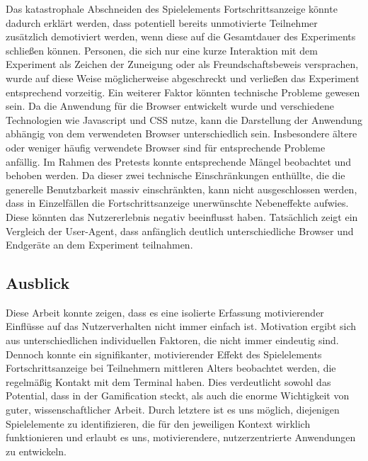 Das katastrophale Abschneiden des Spielelements Fortschrittsanzeige könnte dadurch erklärt werden, dass potentiell bereits unmotivierte Teilnehmer zusätzlich demotiviert werden, wenn diese auf die Gesamtdauer des Experiments schließen können. Personen, die sich nur eine kurze Interaktion mit dem Experiment als Zeichen der Zuneigung oder als Freundschaftsbeweis versprachen, wurde auf diese Weise möglicherweise abgeschreckt und verließen das Experiment entsprechend vorzeitig. Ein weiterer Faktor könnten technische Probleme gewesen sein. Da die Anwendung für die Browser entwickelt wurde und verschiedene Technologien wie Javascript und CSS nutze, kann die Darstellung der Anwendung abhängig von dem verwendeten Browser unterschiedlich sein. Insbesondere ältere oder weniger häufig verwendete Browser sind für entsprechende Probleme anfällig. Im Rahmen des Pretests konnte entsprechende Mängel beobachtet und behoben werden. Da dieser zwei technische Einschränkungen enthüllte, die die generelle Benutzbarkeit massiv einschränkten, kann nicht ausgeschlossen werden, dass in Einzelfällen die Fortschrittsanzeige unerwünschte Nebeneffekte aufwies. Diese könnten das Nutzererlebnis negativ beeinflusst haben. Tatsächlich zeigt ein Vergleich der User-Agent, dass anfänglich deutlich unterschiedliche Browser und Endgeräte an dem Experiment teilnahmen.  

\subsection{Ausblick}
Diese Arbeit konnte zeigen, dass es eine isolierte Erfassung motivierender Einflüsse auf das Nutzerverhalten nicht immer einfach ist. Motivation ergibt sich aus unterschiedlichen individuellen Faktoren, die nicht immer eindeutig sind. Dennoch konnte ein signifikanter, motivierender Effekt des Spielelements Fortschrittsanzeige bei Teilnehmern mittleren Alters beobachtet werden, die regelmäßig Kontakt mit dem Terminal haben. Dies verdeutlicht sowohl das Potential, dass in der Gamification steckt, als auch die enorme Wichtigkeit von guter, wissenschaftlicher Arbeit. Durch letztere ist es uns möglich, diejenigen Spielelemente zu identifizieren, die für den jeweiligen Kontext wirklich funktionieren und erlaubt es uns, motivierendere, nutzerzentrierte Anwendungen zu entwickeln.